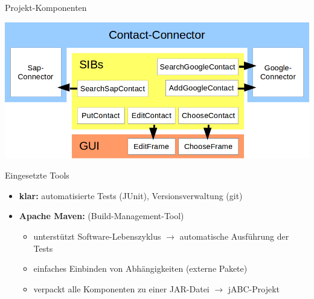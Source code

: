 \begin{frame}{Projekt-Komponenten}
	
\begin{center}
\includegraphics[width=\textheight]{Bilder/projekt_aufbau.png} 
\end{center}

\end{frame}


\begin{frame}{Eingesetzte Tools}
\begin{itemize}[<+->]
	\pause
	\item \textbf{klar:} automatisierte Tests (JUnit), Versionsverwaltung (git)
	\pause
	\item \textbf{Apache Maven:} (Build-Management-Tool)
		\begin{itemize}[<+->]
			\pause
			\item unterstützt Software-Lebenszyklus $\rightarrow$ automatische Ausführung der Tests
			\item einfaches Einbinden von Abhängigkeiten (externe Pakete)
			\item verpackt alle Komponenten zu einer JAR-Datei $\rightarrow$ jABC-Projekt
		\end{itemize}
\end{itemize}
\end{frame}











